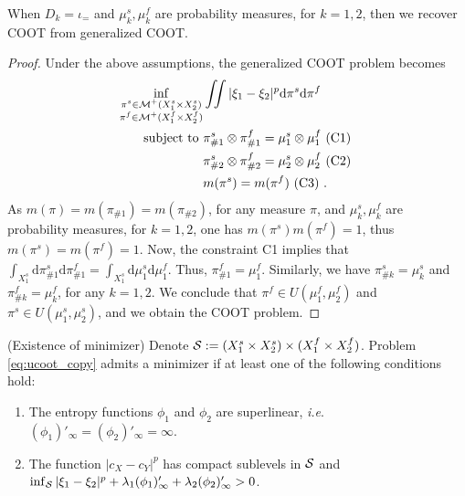 \begin{claim}
  When $D_k = \iota_{=}$ and $\mu_k^s, \mu_k^f$ are probability measures, for $k=1,2$,
  then we recover COOT from generalized COOT.
\end{claim}
\begin{proof}
  Under the above assumptions, the generalized COOT problem becomes
  \begin{equation}
    \begin{split}
      \inf_{\substack{\pi^s \in \mathcal M^+(X_1^s \times X_2^s) \\
      \pi^f \in \mathcal M^+(X_1^f \times X_2^f)}}
      &\iint |\xi_1 - \xi_2|^p \mathrm d\pi^s \mathrm d \pi^f \\
      \text{subject to } &\pi^s_{\#1} \otimes \pi^f_{\#1} = \mu_1^s \otimes \mu_1^f \text{ (C1) } \\
      & \pi^s_{\#2} \otimes \pi^f_{\#2} = \mu_2^s \otimes \mu_2^f \text{ (C2) } \\
      & m(\pi^s) = m(\pi^f) \text{ (C3) }.
    \end{split}
  \end{equation}
  As $m(\pi) = m(\pi_{\#1}) = m(\pi_{\#2})$,
  for any measure $\pi$, and $\mu_k^s, \mu_k^f$ are probability measures, for $k=1,2$,
  one has $m(\pi^s) m(\pi^f) = 1$, thus $m(\pi^s) = m(\pi^f) = 1$.
  Now, the constraint C1 implies that
  $\int_{X_1^s} \mathrm d\pi^s_{\#1} \mathrm d \pi^f_{\#1}
  = \int_{X_1^s} \mathrm d\mu_1^s \mathrm d\mu_1^f$. Thus, $\pi^f_{\#1} = \mu_1^f$.
  Similarly, we have $\pi^s_{\#k} = \mu_k^s$ and $\pi^f_{\#k} = \mu_k^f$, for any $k=1,2$.
  We conclude that $\pi^f \in U(\mu_1^f, \mu_2^f)$ and $\pi^s \in U(\mu_1^s, \mu_2^s)$,
  and we obtain the COOT problem.
\end{proof}

\begin{proposition}
    \label{eq:ucoot_existence_copy}
  (Existence of minimizer) Denote
  $\mathcal S := (X_1^s \times X_2^s) \times (X_1^f \times X_2^f)$.
  Problem \eqref{eq:ucoot_copy} admits a minimizer if at least one of
  the following conditions hold:
  \begin{enumerate}
    \item The entropy functions $\phi_1$ and $\phi_2$ are superlinear, \textit{i.e}.
    $(\phi_1)'_{\infty} = (\phi_2)'_{\infty} = \infty$.
    \item The function $\vert c_X - c_Y \vert^p$ has compact sublevels in $\mathcal S$ and
    $\inf_{\mathcal S} \vert \xi_1 - \xi_2 \vert^p + \lambda_1 (\phi_1)'_{\infty} + \lambda_2 (\phi_2)'_{\infty} > 0$.
  \end{enumerate}
\end{proposition}

